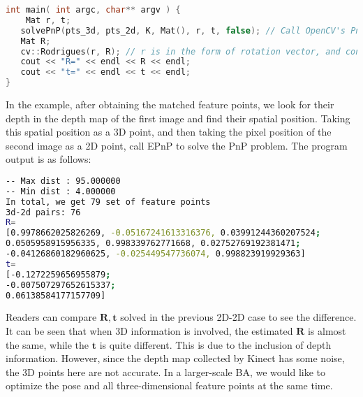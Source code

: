 \begin{lstlisting}[language=c++,caption=slambook2/ch7/pose_estimation_3d2d.cpp（片段）]
int main( int argc, char** argv ) {
    Mat r, t;
   solvePnP(pts_3d, pts_2d, K, Mat(), r, t, false); // Call OpenCV's PnP, you can choose from EPNP, DLS and other methods
   Mat R;
   cv::Rodrigues(r, R); // r is in the form of rotation vector, and converted to a rotation matrix by Rodrigues formula
   cout << "R=" << endl << R << endl;
   cout << "t=" << endl << t << endl;
}
\end{lstlisting}

In the example, after obtaining the matched feature points, we look for their depth in the depth map of the first image and find their spatial position. Taking this spatial position as a 3D point, and then taking the pixel position of the second image as a 2D point, call EPnP to solve the PnP problem. The program output is as follows:

\begin{lstlisting}[language=sh,caption=终端输入：]
% build/pose_estimation_3d2d 1.png 2.png d1.png d2.png
-- Max dist : 95.000000 
-- Min dist : 4.000000 
In total, we get 79 set of feature points
3d-2d pairs: 76
R=
[0.9978662025826269, -0.05167241613316376, 0.03991244360207524;
0.0505958915956335, 0.998339762771668, 0.02752769192381471;
-0.04126860182960625, -0.025449547736074, 0.998823919929363]
t=
[-0.1272259656955879;
-0.007507297652615337;
0.06138584177157709]
\end{lstlisting}

Readers can compare $\bm{R},\bm{t}$ solved in the previous 2D-2D case to see the difference. It can be seen that when 3D information is involved, the estimated $\bm{R}$ is almost the same, while the $\bm{t}$ is quite different. This is due to the inclusion of depth information. However, since the depth map collected by Kinect has some noise, the 3D points here are not accurate. In a larger-scale BA, we would like to optimize the pose and all three-dimensional feature points at the same time.


